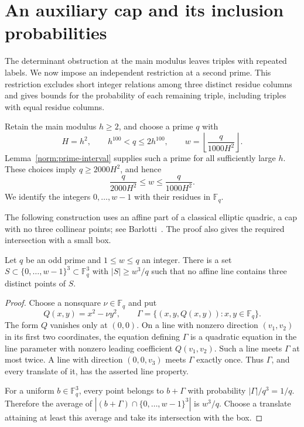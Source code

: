 \section{An auxiliary cap and its inclusion probabilities}
\label{aux:section}

The determinant obstruction at the main modulus leaves triples with
repeated labels.  We now impose an independent restriction at a second
prime.  This restriction excludes short integer relations among three
distinct residue columns and gives bounds for the probability of each
remaining triple, including triples with equal residue columns.

Retain the main modulus $h\ge 2$, and choose a prime $q$ with
\begin{equation}\label{aux:parameters}
 H=h^2,\qquad h^{100}<q\le 2h^{100},\qquad
 w=\left\lfloor\frac{q}{1000H^2}\right\rfloor.
\end{equation}
Lemma~\ref{norm:prime-interval} supplies such a prime for all sufficiently
large $h$. These choices imply
$q\ge 2000H^2$, and hence
\[
 \frac{q}{2000H^2}\le w\le\frac{q}{1000H^2}.
\]
We identify the integers $0,\ldots,w-1$ with their residues in
$\mathbb F_q$.

The following construction uses an affine part of a classical elliptic
quadric, a cap with no three collinear points; see
Barlotti~\cite[p.~248]{Barlotti1956}. The proof also gives the required
intersection with a small box.

\begin{lemma}\label{aux:cap}
Let $q$ be an odd prime and $1\le w\le q$ an integer.  There is a set
$S\subset\{0,\ldots,w-1\}^3\subset\mathbb F_q^3$ with
$|S|\ge w^3/q$ such that no affine line contains three distinct points
of $S$.
\end{lemma}

\begin{proof}
Choose a nonsquare $\nu\in\mathbb F_q$ and put
\[
 Q(x,y)=x^2-\nu y^2,\qquad
 \Gamma=\{(x,y,Q(x,y)):x,y\in\mathbb F_q\}.
\]
The form $Q$ vanishes only at $(0,0)$.  On a line with nonzero direction
$(v_1,v_2)$ in its first two coordinates, the equation defining
$\Gamma$ is a quadratic equation in the line parameter with nonzero
leading coefficient $Q(v_1,v_2)$.  Such a line meets $\Gamma$ at most
twice.  A line with direction $(0,0,v_3)$ meets $\Gamma$ exactly once.
Thus $\Gamma$, and every translate of it, has the asserted line
property.

For a uniform $b\in\mathbb F_q^3$, every point belongs to
$b+\Gamma$ with probability $|\Gamma|/q^3=1/q$.  Therefore the average
of $|(b+\Gamma)\cap\{0,\ldots,w-1\}^3|$ is $w^3/q$.
Choose a translate attaining at least this average and take its
intersection with the box.
\end{proof}

